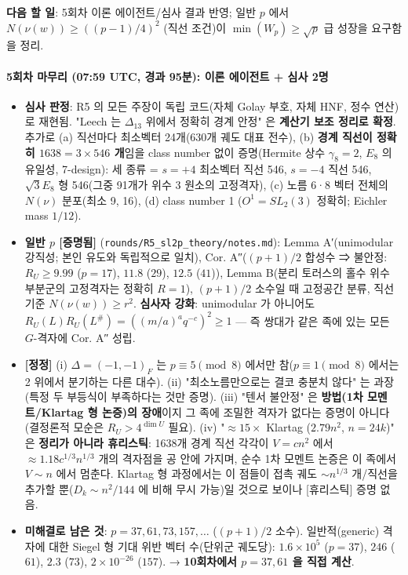 \textbf{다음 할 일}: 5회차 이론 에이전트/심사 결과 반영; 일반 \(p\) 에서 \(N(\nu(w))\ge((p-1)/4)^2\) (직선 조건)이 \(\min(W_p)\ge\sqrt p\) 급 성장을 요구함을 정리.

\hypertarget{uxd68cuxcc28-uxb9c8uxbb34uxb9ac-0759-utc-uxacbduxacfc-95uxbd84-uxc774uxb860-uxc5d0uxc774uxc804uxd2b8-uxc2ecuxc0ac-2uxba85}{%
\paragraph{5회차 마무리 (07:59 UTC, 경과 95분): 이론 에이전트 + 심사 2명}\label{uxd68cuxcc28-uxb9c8uxbb34uxb9ac-0759-utc-uxacbduxacfc-95uxbd84-uxc774uxb860-uxc5d0uxc774uxc804uxd2b8-uxc2ecuxc0ac-2uxba85}}

\begin{itemize}
\tightlist
\item
  \textbf{심사 판정}: R5 의 모든 주장이 독립 코드(자체 Golay 부호, 자체 HNF, 정수 연산)로 재현됨. "Leech 는 \(\Delta_{13}\) 위에서 정확히 경계 안정" 은 \textbf{계산기 보조 정리로 확정}. 추가로 (a) 직선마다 최소벡터 24개(630개 궤도 대표 전수), (b) \textbf{경계 직선이 정확히 \(1638=3\times546\) 개}임을 class number 없이 증명(Hermite 상수 \(\gamma_8=2\), \(E_8\) 의 유일성, 7-design): 세 종류 = \(s=+4\) 최소벡터 직선 546, \(s=-4\) 직선 546, \(\sqrt3E_8\) 형 546(그중 91개가 위수 3 원소의 고정격자), (c) 노름 6·8 벡터 전체의 \(N(\nu)\) 분포(최소 9, 16), (d) class number 1 (\(O^1=SL_2(3)\) 정확히; Eichler mass \(1/12\)).
\item
  \textbf{일반 \(p\) {[}증명됨{]}} (\texttt{rounds/R5\_sl2p\_theory/notes.md}): Lemma A′(unimodular 강직성; 본인 유도와 독립적으로 일치), Cor. A″(\((p+1)/2\) 합성수 ⇒ 불안정: \(R_U\ge9.99\) (\(p=17\)), \(11.8\) (\(29\)), \(12.5\) (\(41\))), Lemma B(분리 토러스의 홀수 위수 부분군의 고정격자는 정확히 \(R=1\)), \((p+1)/2\) 소수일 때 고정공간 분류, 직선 기준 \(N(\nu(w))\ge r^2\). \textbf{심사자 강화}: unimodular 가 아니어도 \(R_U(L)R_U(L^\#)=((m/a)^aq^{-c})^2\ge1\) --- 즉 쌍대가 같은 족에 있는 모든 \(G\)-격자에 Cor. A″ 성립.
\item
  \textbf{{[}정정{]}} (i) \(\Delta=(-1,-1)_F\) 는 \(p\equiv5\pmod8\) 에서만 참(\(p\equiv1\pmod 8\) 에서는 2 위에서 분기하는 다른 대수). (ii) "최소노름만으로는 결코 충분치 않다" 는 과장(특정 두 부등식이 부족하다는 것만 증명). (iii) "텐서 불안정" 은 \textbf{방법(1차 모멘트/Klartag 형 논증)의 장애}이지 그 족에 조밀한 격자가 없다는 증명이 아니다(결정론적 모순은 \(R_U>4^{\dim U}\) 필요). (iv) "\(\approx15\times\) Klartag (\(2.79n^2\), \(n=24k\))" 은 \textbf{정리가 아니라 휴리스틱}: 1638개 경계 직선 각각이 \(V=cn^2\) 에서 \(\approx1.18c^{1/3}n^{1/3}\) 개의 격자점을 공 안에 가지며, 순수 1차 모멘트 논증은 이 족에서 \(V\sim n\) 에서 멈춘다. Klartag 형 과정에서는 이 점들이 접촉 궤도 \(\sim n^{1/3}\) 개/직선을 추가할 뿐(\(D_k\sim n^2/144\) 에 비해 무시 가능)일 것으로 보이나 {[}휴리스틱{]} 증명 없음.
\item
  \textbf{미해결로 남은 것}: \(p=37,61,73,157,\dots\) (\((p+1)/2\) 소수). 일반적(generic) 격자에 대한 Siegel 형 기대 위반 벡터 수(단위군 궤도당): \(1.6\times10^5\) (\(p=37\)), \(246\) (\(61\)), \(2.3\) (\(73\)), \(2\times10^{-26}\) (\(157\)). → \textbf{10회차에서 \(p=37,61\) 을 직접 계산}.
\end{itemize}

